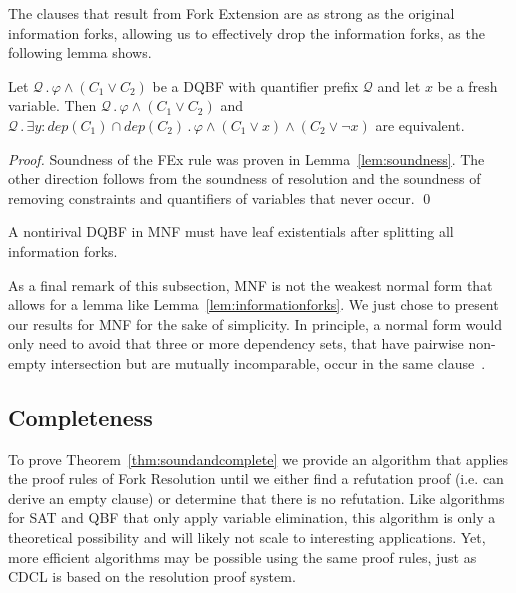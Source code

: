 \documentclass{svjour3}
\newcommand{\ldot}{\mathpunct{.}}
\newcommand{\dep}{\mathit{dep}}
\begin{document}
The clauses that result from Fork Extension are as strong as the original information forks, allowing us to effectively drop the information forks, as the following lemma shows.

\begin{lemma}
\label{lem:elimforks}
Let $\mathcal Q\ldot\varphi \wedge (C_1\vee C_2)$ be a DQBF with quantifier prefix $\mathcal Q$ and let $x$ be a fresh variable. 
Then $\mathcal Q\ldot \varphi \wedge (C_1\vee C_2)$ and $\mathcal Q\ldot \exists y: \dep(C_1)\cap\dep(C_2) \ldot \varphi \wedge (C_1\vee x) \wedge (C_2\vee \neg x)$ are equivalent.
\end{lemma}

\begin{proof}
	Soundness of the {\sf FEx} rule was proven in Lemma~\ref{lem:soundness}. 
	The other direction follows from the soundness of resolution and the soundness of removing constraints and quantifiers of variables that never occur.
\qed
\end{proof}

\begin{corollary}
\label{cor:leafexists}
A nontirival DQBF in MNF must have leaf existentials after splitting all information forks.
\end{corollary}

As a final remark of this subsection, MNF is not the weakest normal form that allows for a lemma like Lemma~\ref{lem:informationforks}.
We just chose to present our results for MNF for the sake of simplicity.
In principle, a normal form would only need to avoid that three or more dependency sets, that have pairwise non-empty intersection but are mutually incomparable, occur in the same clause~\cite{Tentrup/2019/SymbolicReactiveSynthesis}.


\subsection{Completeness}
\label{ssect:completeness}

To prove Theorem~\ref{thm:soundandcomplete} we provide an algorithm that applies the proof rules of Fork Resolution until we either find a refutation proof (i.e. can derive an empty clause) or determine that there is no refutation.
Like algorithms for SAT and QBF that only apply variable elimination, this algorithm is only a theoretical possibility and will likely not scale to interesting applications.
Yet, more efficient algorithms may be possible using the same proof rules, just as CDCL is based on the resolution proof system. 
\end{document}
